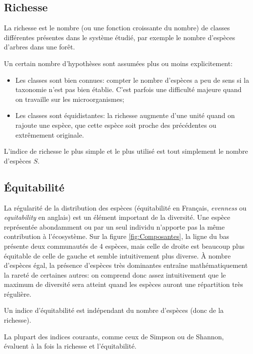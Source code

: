 \documentclass[
  11pt,
  french,
  a4paper,
  extrafontsizes,onecolumn,openright
  ]{memoir}
\providecommand{\tightlist}{%
  \setlength{\itemsep}{0pt}\setlength{\parskip}{0pt}}
\begin{document}
\hypertarget{richesse}{%
\subsection{Richesse}\label{richesse}}

La richesse \autocite[terme introduit par][]{Mcintosh1967} est le nombre (ou une fonction croissante du nombre) de classes différentes présentes dans le système étudié, par exemple le nombre d'espèces d'arbres dans une forêt.

Un certain nombre d'hypothèses sont assumées plus ou moins explicitement:

\begin{itemize}
\tightlist
\item
  Les classes sont bien connues: compter le nombre d'espèces a peu de sens si la taxonomie n'est pas bien établie.
  C'est parfois une difficulté majeure quand on travaille sur les microorganismes;
\item
  Les classes sont équidistantes: la richesse augmente d'une unité quand on rajoute une espèce, que cette espèce soit proche des précédentes ou extrêmement originale.
\end{itemize}

L'indice de richesse le plus simple et le plus utilisé est tout simplement le nombre d'espèces \(S\).

\hypertarget{uxe9quitabilituxe9}{%
\subsection{Équitabilité}\label{uxe9quitabilituxe9}}

La régularité de la distribution des espèces (équitabilité en Français, \emph{evenness} ou \emph{equitability} en anglais) est un élément important de la diversité.
Une espèce représentée abondamment ou par un seul individu n'apporte pas la même contribution à l'écosystème.
Sur la figure \ref{fig:Composantes}, la ligne du bas présente deux communautés de 4 espèces, mais celle de droite est beaucoup plus équitable de celle de gauche et semble intuitivement plus diverse.
À nombre d'espèces égal, la présence d'espèces très dominantes entraîne mathématiquement la rareté de certaines autres: on comprend donc assez intuitivement que le maximum de diversité sera atteint quand les espèces auront une répartition très régulière.

Un indice d'équitabilité est indépendant du nombre d'espèces (donc de la richesse).

La plupart des indices courants, comme ceux de Simpson ou de Shannon, évaluent à la fois la richesse et l'équitabilité.
\end{document}
